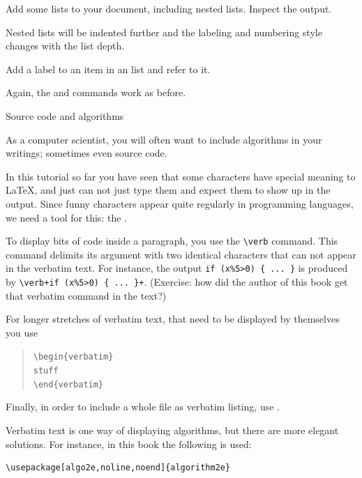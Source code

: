 \begin{exercise}
Add some lists to your document, including nested
lists. Inspect the output.
\end{exercise}
\begin{outcome}
{Nested lists will be indented further and the labeling and numbering
style changes with the list depth.}
\end{outcome}

\begin{exercise}
Add a label to an item in an  list and refer
to it.
\end{exercise}
\begin{outcome}
{Again, the \n{\\label} and \n{\\ref} commands work as before.}
\end{outcome}

 {Source code and algorithms}

As a computer scientist, you will often want to include 
algorithms in your writings; sometimes even source code.

In this tutorial so far you have seen that some characters
have special meaning to \LaTeX{}, and just can not just type them
and expect them to show up in the output. Since funny characters
appear quite regularly in programming languages, we need a tool for this:
the .

To display bits of code inside a paragraph, you use the \verb+\verb+
command.  This command delimits its argument with two identical
characters that can not appear in the verbatim text. For instance,
the output
\verb+if (x%5>0) { ... }+ is produced by \verb/\verb+if (x%5>0) { ... }+/.
(Exercise: how did the author of this book get that verbatim command
in the text?)

For longer stretches of verbatim text, that need to be displayed
by themselves you use
\begin{quote}
\leavevmode\noindent\parindent=0pt
\hbox{\verb+\begin{verbatim}+}\\
\hbox{\verb+stuff+}\\
\hbox{\verb+\end{verbatim}+}
\end{quote}
Finally, in order to include a whole file as verbatim listing, use
\n{}.

Verbatim text is one way of displaying algorithms, but there are
more elegant solutions. For instance, in this book the following is
used:
\begin{verbatim}
\usepackage[algo2e,noline,noend]{algorithm2e}
\end{verbatim}

